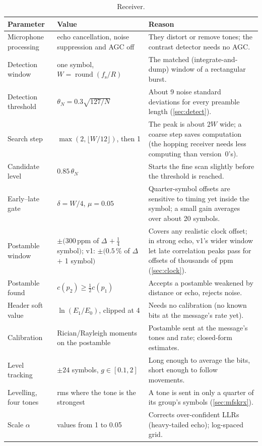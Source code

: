 \documentclass[11pt,a4paper]{article}
\newcommand{\round}[1]{\operatorname{round}\!\left(#1\right)}
\newcommand{\fs}{f_{\mathrm{s}}}
\theoremstyle{remark}
\begin{document}
\begin{table}[p]
\centering
\caption{Receiver.}
\label{tab:prx}
\small
\begin{tabularx}{\linewidth}{>{\raggedright\arraybackslash}p{3.4cm}>{\raggedright\arraybackslash}p{3.1cm}X}
\toprule
Parameter & Value & Reason\\
\midrule
Microphone processing & echo cancellation, noise suppression and AGC off & They distort or remove tones; the contrast detector needs no AGC.\\
Detection window & one symbol, $W = \round{\fs/R}$ & The matched (integrate-and-dump) window of a rectangular burst.\\
Detection threshold & $\theta_N = 0.3\sqrt{127/N}$ & About 9 noise standard deviations for every preamble length (\cref{sec:detect}).\\
Search step & $\max(2, \lfloor W/12 \rfloor)$, then 1 & The peak is about $2W$ wide; a coarse step saves computation (the hopping receiver needs less computing than version~0's).\\
Candidate level & $0.85\,\theta_N$ & Starts the fine scan slightly before the threshold is reached.\\
Early--late gate & $\delta = W/4$, $\mu = 0.05$ & Quarter-symbol offsets are sensitive to timing yet inside the symbol; a small gain averages over about 20 symbols.\\
Postamble window & $\pm(300$\,ppm of $\Delta$ $+\ \tfrac14$ symbol$)$; v1: $\pm(0.5\,\%$ of $\Delta$ $+$ 1 symbol$)$ & Covers any realistic clock offset; in strong echo, v1's wider window let late correlation peaks pass for offsets of thousands of ppm (\cref{sec:clock}).\\
Postamble found & $c(p_2) \ge \tfrac12 c(p_1)$ & Accepts a postamble weakened by distance or echo, rejects noise.\\
Header soft value & $\ln(E_1/E_0)$, clipped at 4 & Needs no calibration (no known bits at the message's rate yet).\\
Calibration & Rician/Rayleigh moments on the postamble & Postamble sent at the message's tones and rate; closed-form estimates.\\
Level tracking & $\pm 24$ symbols, $g \in [0.1, 2]$ & Long enough to average the bits, short enough to follow movements.\\
Levelling, four tones & rms where the tone is the strongest & A tone is sent in only a quarter of its group's symbols (\cref{sec:mfskrx}).\\
Scale $\alpha$ & 40 values from 1 to 0.05 & Corrects over-confident LLRs (heavy-tailed echo); log-spaced grid.\\

\end{tabularx}
\end{table}
\end{document}
